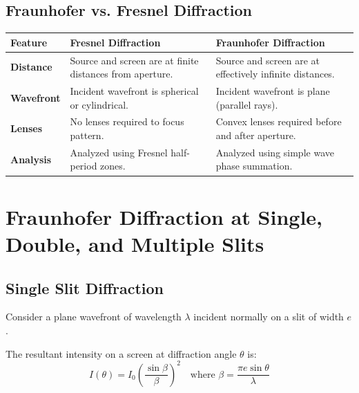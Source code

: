 \documentclass[12pt,a4paper]{article}
\begin{document}
\subsection{Fraunhofer vs. Fresnel Diffraction}

\begin{tabularx}{\linewidth}{|B{3.2cm}|Y|Y|}
\hline
\textbf{Feature} & \textbf{Fresnel Diffraction} & \textbf{Fraunhofer Diffraction} \\
\hline
\textbf{Distance} & Source and screen are at finite distances from aperture. & Source and screen are at effectively infinite distances. \\
\hline
\textbf{Wavefront} & Incident wavefront is spherical or cylindrical. & Incident wavefront is plane (parallel rays). \\
\hline
\textbf{Lenses} & No lenses required to focus pattern. & Convex lenses required before and after aperture. \\
\hline
\textbf{Analysis} & Analyzed using Fresnel half-period zones. & Analyzed using simple wave phase summation. \\
\hline
\end{tabularx}

\section{Fraunhofer Diffraction at Single, Double, and Multiple Slits}

\subsection{Single Slit Diffraction}

Consider a plane wavefront of wavelength $\lambda$ incident normally on a slit of width $e$.

\begin{tcolorbox}[formulabox, title={\textbf{Single Slit Intensity Formula}}]
The resultant intensity on a screen at diffraction angle $\theta$ is:
\begin{equation}
I(\theta) = I_0 \left(\frac{\sin \beta}{\beta}\right)^2 \quad \text{where } \beta = \frac{\pi e \sin \theta}{\lambda}
\end{equation}
\end{tcolorbox}
\end{document}
